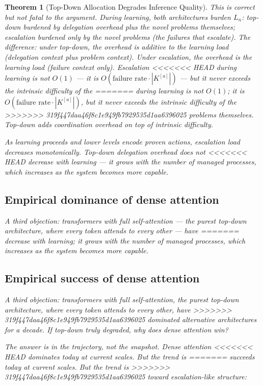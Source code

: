 \documentclass[11pt]{article}
\newtheorem{theorem}{Theorem}
\theoremstyle{definition}
\begin{document}
\begin{theorem}[Top-Down Allocation Degrades Inference Quality]
This is correct but not fatal to the argument. During learning, both
architectures burden $L_n$: top-down burdened by delegation overhead
plus the novel problems themselves; escalation burdened only by the
novel problems (the failures that escalate). The difference: under
top-down, the overhead is \emph{additive} to the learning load
(delegation context plus problem context). Under escalation, the
overhead \emph{is} the learning load (failure context only). Escalation
<<<<<<< HEAD
during learning is not $O(1)$ --- it is $O(\text{failure rate} \cdot
|K^{[a]}|)$ --- but it never exceeds the intrinsic difficulty of the
=======
during learning is not $O(1)$; it is $O(\text{failure rate} \cdot
|K^{[a]}|)$, but it never exceeds the intrinsic difficulty of the
>>>>>>> 319f447daa46f8c1e949fb7929535d1aa6396025
problems themselves. Top-down adds coordination overhead on top of
intrinsic difficulty.

As learning proceeds and lower levels encode proven actions, escalation
load decreases monotonically. Top-down delegation overhead does not
<<<<<<< HEAD
decrease with learning --- it grows with the number of managed processes,
which increases as the system becomes more capable.

\subsection{Empirical dominance of dense attention}

A third objection: transformers with full self-attention --- the purest
top-down architecture, where every token attends to every other --- have
=======
decrease with learning; it grows with the number of managed processes,
which increases as the system becomes more capable.

\subsection{Empirical success of dense attention}

A third objection: transformers with full self-attention, the purest
top-down architecture, where every token attends to every other, have
>>>>>>> 319f447daa46f8c1e949fb7929535d1aa6396025
dominated alternative architectures for a decade. If top-down truly
degraded, why does dense attention win?

The answer is in the trajectory, not the snapshot. Dense attention
<<<<<<< HEAD
dominates \emph{today} at \emph{current scales}. But the trend is
=======
succeeds \emph{today} at \emph{current scales}. But the trend is
>>>>>>> 319f447daa46f8c1e949fb7929535d1aa6396025
toward escalation-like structure:


\end{theorem}
\end{document}
